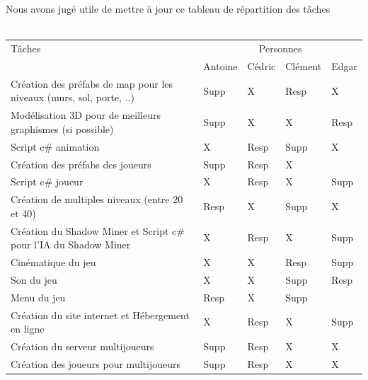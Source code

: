 \documentclass[titlepage, 13px, a4paper]{article}
\begin{document}
\paragraph{} \hspace{0pt} \\ 
Nous avons jugé utile de mettre à jour ce tableau de répartition des tâches
\\ \\
{\normalsize
	\begin{tabular}{|p{6cm}|p{1.2cm}|p{1.2cm}|p{1.2cm}|p{1.2cm}|}
		\hline
		Tâches & \multicolumn{4}{|c|}{Personnes} \\ 
		\cline{2-5}
			& Antoine & Cédric & Clément & Edgar \\
		\hline
		Création des préfabs de map pour les niveaux (murs, sol, porte, ..) & Supp\footnotemark[2] & X & Resp\footnotemark[1] & X \\
		\hline
		Modélisation 3D pour de meilleurs graphismes (si possible) & Supp\footnotemark[2] & X & X & Resp\footnotemark[1] \\
		\hline
		Script c\# animation & X & Resp\footnotemark[1] & Supp\footnotemark[2] & X \\
		\hline
		Création des préfabs des joueurs & Supp\footnotemark[2] & Resp\footnotemark[1] & X &  \\
		\hline
		Script c\# joueur & X & Resp\footnotemark[1] & X & Supp\footnotemark[2] \\
		\hline
		Création de multiples niveaux (entre 20 et 40) & Resp\footnotemark[1] & X & Supp\footnotemark[2] & X \\
		\hline
		Création du Shadow Miner et Script c\# pour l'IA du Shadow Miner & X & Resp\footnotemark[1] & X & Supp\footnotemark[2] \\
		\hline
		Cinématique du jeu & X & X & Resp\footnotemark[1] & Supp\footnotemark[2] \\
		\hline
		Son du jeu & X & X & Supp\footnotemark[2] & Resp\footnotemark[1] \\
		\hline
		Menu du jeu & Resp\footnotemark[1] & X & Supp\footnotemark[2] & \\
		\hline
		Création du site internet et Hébergement en ligne & X & Resp\footnotemark[1] & X & Supp\footnotemark[2] \\
		\hline
		Création du serveur multijoueurs & Supp\footnotemark[2] & Resp\footnotemark[1] & X & X \\
		\hline
		Création des joueurs pour multijoueurs & Supp\footnotemark[2] & Resp\footnotemark[1] & X & X \\

\end{tabular}}
\end{document}
